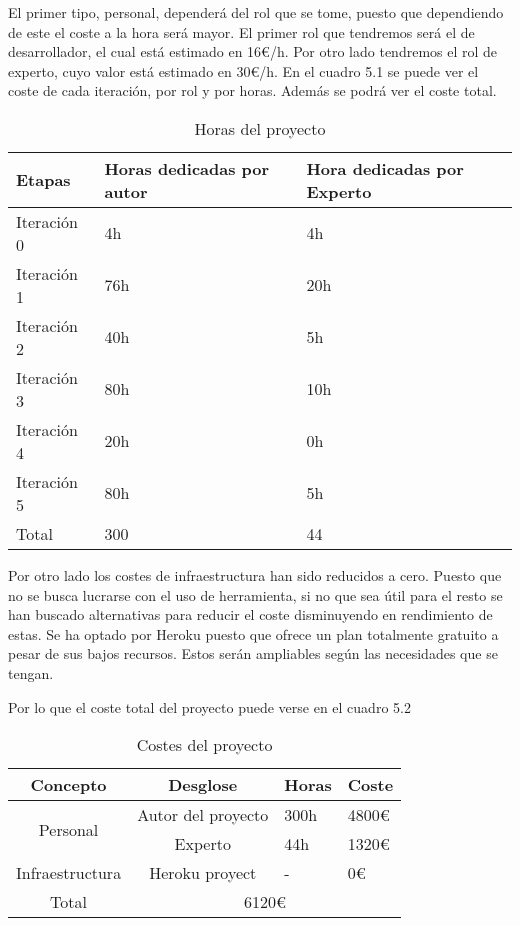 El primer tipo, personal, dependerá del rol que se tome, puesto que dependiendo de este
el coste a la hora será mayor. El primer rol que tendremos será el de desarrollador, el
cual está estimado en 16€/h. Por otro lado tendremos el rol de experto, cuyo valor está estimado
en 30€/h. En el cuadro 5.1 se puede ver el coste de cada iteración, por rol y por horas.
Además se podrá ver el coste total.

\begin{table}[]
  \centering
  \caption{Horas del proyecto}
  \label{tab:Horas del proyecto}
  \begin{tabular}{|l|l|l|}
    \hline
    Etapas & Horas dedicadas por autor & Hora dedicadas por Experto \\ \hline
    Iteración 0 & 4h & 4h \\ \hline
    Iteración 1 & 76h & 20h \\ \hline
    Iteración 2 & 40h & 5h \\ \hline
    Iteración 3 & 80h & 10h \\ \hline
    Iteración 4 & 20h & 0h \\ \hline
    Iteración 5 & 80h & 5h \\ \hline
    Total & 300 & 44 \\ \hline
  \end{tabular}
\end{table}

Por otro lado los costes de infraestructura han sido reducidos a cero. Puesto que no se
busca lucrarse con el uso de herramienta, si no que sea útil para el resto se han buscado
alternativas para reducir el coste disminuyendo en rendimiento de estas. Se ha optado
por Heroku puesto que ofrece un plan totalmente gratuito a pesar de sus bajos recursos.
Estos serán ampliables según las necesidades que se tengan.

Por lo que el coste total del proyecto puede verse en el cuadro 5.2

\begin{table}[]
  \centering
  \caption{Costes del proyecto}
  \label{tab:Costes del proyecto}
  \begin{tabular}{|c|c|l|l|}
    \hline
    Concepto & Desglose & Horas & Coste \\ \hline
    \multirow{2}{*}{Personal} & Autor del proyecto & 300h & 4800€ \\ \cline{2-4}
    & Experto & 44h & 1320€ \\ \hline
    Infraestructura & Heroku proyect & - & 0€ \\ \hline
    Total & \multicolumn{3}{c|}{6120€} \\ \hline
  \end{tabular}
\end{table}

